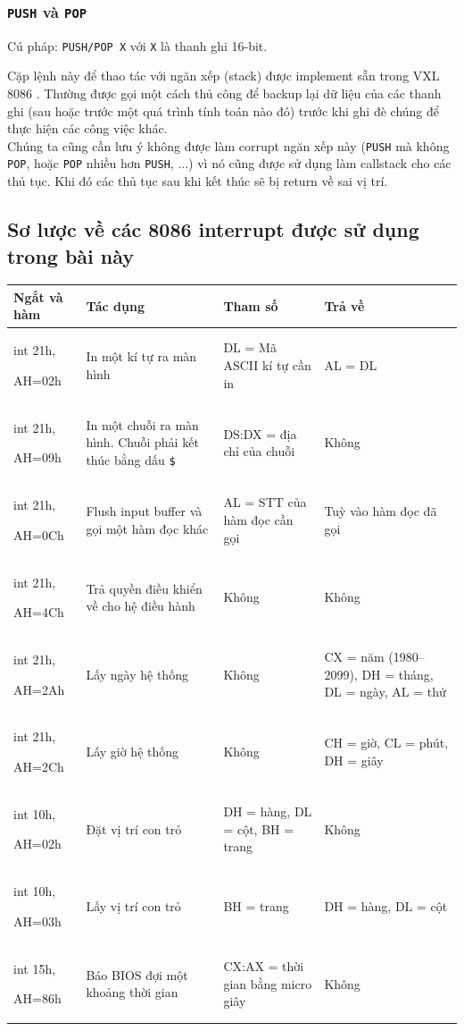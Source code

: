 \documentclass[12pt, final]{article}
\newcommand{\code}[1]{\texttt{#1}}
\begin{document}
\subsubsection{\code{PUSH} và \code{POP}}
Cú pháp: \code{PUSH/POP X} với \code{X} là thanh ghi 16-bit.

Cặp lệnh này để thao tác với ngăn xếp (stack) được implement sẵn trong VXL 8086 \cite{asmstack}. Thường được gọi một cách thủ công để backup lại dữ liệu của các thanh ghi (sau hoặc trước một quá trình tính toán nào đó) trước khi ghi đè chúng để thực hiện các công việc khác. \\
Chúng ta cũng cần lưu ý không được làm corrupt ngăn xếp này (\code{PUSH} mà không \code{POP}, hoặc \code{POP} nhiều hơn \code{PUSH}, ...) vì nó cũng được sử dụng làm callstack cho các thủ tục. Khi đó các thủ tục sau khi kết thúc sẽ bị return về sai vị trí. 

\subsection{Sơ lược về các 8086 interrupt được sử dụng trong bài này\cite{8086interrupt}}

\begin{table}[H]
\centering

\begin{tabularx}{\textwidth}{| X | X | X | X |}
\hline
\textbf{Ngắt và hàm} & \textbf{Tác dụng} & \textbf{Tham số} & \textbf{Trả về} \\
\hline
int 21h,\par AH=02h & In một kí tự ra màn hình & DL = Mã ASCII kí tự cần in & AL = DL \\
\hline
int 21h,\par AH=09h & In một chuỗi ra màn hình. Chuỗi phải kết thúc bằng dấu \code{\$} & DS:DX = địa chỉ của chuỗi & Không \\
\hline
int 21h,\par AH=0Ch & Flush input buffer và gọi một hàm đọc khác & AL = STT của hàm đọc cần gọi & Tuỳ vào hàm đọc đã gọi \\
\hline
int 21h,\par AH=4Ch & Trả quyền điều khiển về cho hệ điều hành & Không & Không \\
\hline
int 21h,\par AH=2Ah & Lấy ngày hệ thống & Không & CX = năm (1980--2099), DH = tháng, DL = ngày, AL = thứ \\
\hline
int 21h,\par AH=2Ch & Lấy giờ hệ thống & Không & CH = giờ, CL = phút, DH = giây \\
\hline
int 10h,\par AH=02h & Đặt vị trí con trỏ & DH = hàng, DL = cột, BH = trang & Không \\
\hline
int 10h,\par AH=03h & Lấy vị trí con trỏ & BH = trang & DH = hàng, DL = cột \\
\hline
int 15h,\par AH=86h & Báo BIOS đợi một khoảng thời gian & CX:AX = thời gian bằng micro giây & Không \\
\hline
\end{tabularx}

\end{table}
\end{document}
